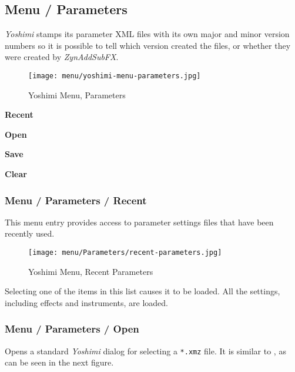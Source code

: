 \subsection{Menu / Parameters}
\label{subsec:menu_parameters}

   \textsl{Yoshimi} stamps its parameter XML files with its own major and
   minor version numbers so it is possible to tell which version created the
   files, or whether they were created by \textsl{ZynAddSubFX}.

\begin{figure}[H]
   \centering 
   \texttt{[image: menu/yoshimi-menu-parameters.jpg]}
   \caption{Yoshimi Menu, Parameters}
   \label{fig:yoshimi_menu_parameters}
\end{figure}

   \begin{enumber}
      \item \textbf{Recent}
      \item \textbf{Open}
      \item \textbf{Save}
      \item \textbf{Clear}
   \end{enumber}

\subsubsection{Menu / Parameters / Recent}
\label{subsubsec:menu_parameters_recent}

   This menu entry provides access to parameter settings files that have
   been recently used.

\begin{figure}[H]
   \centering 
   \texttt{[image: menu/Parameters/recent-parameters.jpg]}
   \caption{Yoshimi Menu, Recent Parameters}
   \label{fig:yoshimi_menu_recent_parameters}
\end{figure}

   Selecting one of the items in this list causes it to be loaded.
   All the settings, including effects and instruments, are loaded.

\subsubsection{Menu / Parameters / Open}
\label{subsubsec:menu_parameters_open}

   Opens a standard \textsl{Yoshimi} dialog for selecting a
   \texttt{*.xmz} file.
   It is similar to
   ,
   as can be seen in the next figure.


